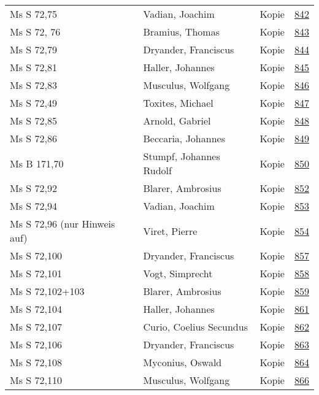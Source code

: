 \documentclass[10pt,a4paper,landscape]{report}
\begin{document}
\begin{longtable}{p{16cm}p{4cm}lr}
Ms S 72,75	&	Vadian, Joachim	&	Kopie	&	\href{http://130.60.24.72/assignment/842}{842}\\
Ms S 72, 76	&	Bramius, Thomas	&	Kopie	&	\href{http://130.60.24.72/assignment/843}{843}\\
Ms S 72,79	&	Dryander, Franciscus	&	Kopie	&	\href{http://130.60.24.72/assignment/844}{844}\\
Ms S 72,81	&	Haller, Johannes	&	Kopie	&	\href{http://130.60.24.72/assignment/845}{845}\\
Ms S 72,83	&	Musculus, Wolfgang	&	Kopie	&	\href{http://130.60.24.72/assignment/846}{846}\\
Ms S 72,49	&	Toxites, Michael	&	Kopie	&	\href{http://130.60.24.72/assignment/847}{847}\\
Ms S 72,85	&	Arnold, Gabriel	&	Kopie	&	\href{http://130.60.24.72/assignment/848}{848}\\
Ms S 72,86	&	Beccaria, Johannes	&	Kopie	&	\href{http://130.60.24.72/assignment/849}{849}\\
Ms B 171,70	&	Stumpf, Johannes Rudolf	&	Kopie	&	\href{http://130.60.24.72/assignment/850}{850}\\
Ms S 72,92	&	Blarer, Ambrosius	&	Kopie	&	\href{http://130.60.24.72/assignment/852}{852}\\
Ms S 72,94	&	Vadian, Joachim	&	Kopie	&	\href{http://130.60.24.72/assignment/853}{853}\\
Ms S 72,96 (nur Hinweis auf)	&	Viret, Pierre	&	Kopie	&	\href{http://130.60.24.72/assignment/854}{854}\\
Ms S 72,100	&	Dryander, Franciscus	&	Kopie	&	\href{http://130.60.24.72/assignment/857}{857}\\
Ms S 72,101	&	Vogt, Simprecht	&	Kopie	&	\href{http://130.60.24.72/assignment/858}{858}\\
Ms S 72,102+103	&	Blarer, Ambrosius	&	Kopie	&	\href{http://130.60.24.72/assignment/859}{859}\\
Ms S 72,104	&	Haller, Johannes	&	Kopie	&	\href{http://130.60.24.72/assignment/861}{861}\\
Ms S 72,107	&	Curio, Coelius Secundus	&	Kopie	&	\href{http://130.60.24.72/assignment/862}{862}\\
Ms S 72,106	&	Dryander, Franciscus	&	Kopie	&	\href{http://130.60.24.72/assignment/863}{863}\\
Ms S 72,108	&	Myconius, Oswald	&	Kopie	&	\href{http://130.60.24.72/assignment/864}{864}\\
Ms S 72,110	&	Musculus, Wolfgang	&	Kopie	&	\href{http://130.60.24.72/assignment/866}{866}\\

\end{longtable}
\end{document}
